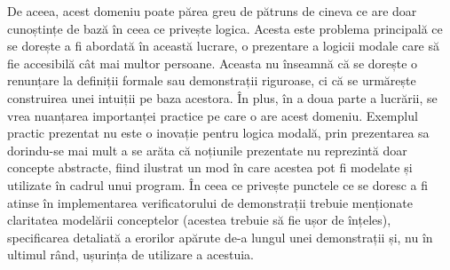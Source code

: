 \documentclass[12pt, openany]{book}
\begin{document}
            \par{}
                De aceea, acest domeniu poate părea greu de pătruns de cineva ce are doar cunoștințe de bază în ceea ce 
                privește logica. Acesta este problema principală ce se dorește a fi abordată în această lucrare, o 
                prezentare a logicii modale care să fie accesibilă cât mai multor persoane. Aceasta nu înseamnă că se 
                dorește o renunțare la definiții formale sau demonstrații riguroase, ci că se urmărește construirea unei
                intuiții pe baza acestora. În plus, în a doua parte a lucrării, se vrea nuanțarea importanței practice 
                pe care o are acest domeniu. Exemplul practic prezentat nu este o inovație pentru logica modală, prin 
                prezentarea sa dorindu-se mai mult a se arăta că noțiunile prezentate nu reprezintă doar concepte 
                abstracte, fiind ilustrat un mod în care acestea pot fi modelate și utilizate în cadrul unui program. În 
                ceea ce privește punctele ce se doresc a fi atinse în implementarea verificatorului de demonstrații 
                trebuie menționate claritatea modelării conceptelor (acestea trebuie să fie ușor de înțeles), 
                specificarea detaliată a erorilor apărute de-a lungul unei demonstrații și, nu în ultimul rând, ușurința 
                de utilizare a acestuia.
\end{document}
